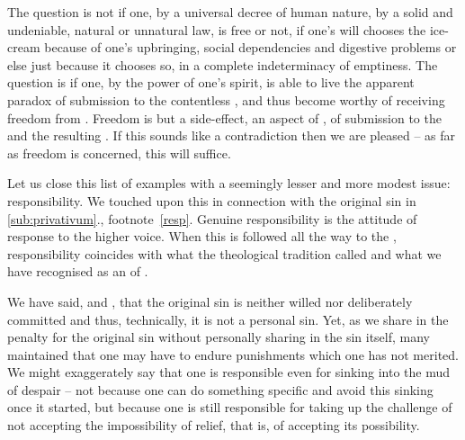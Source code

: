 The question is not if one, by a universal decree of human nature, by a solid
and undeniable, natural or unnatural law, is free or not, if one's will chooses
the ice-cream because of one's upbringing, social dependencies and digestive
problems or else just because it chooses so, in a complete indeterminacy of
emptiness.  The question is if one, by the power of one's {spirit}, is able to
live the apparent paradox of submission to the contentless , and
thus become worthy of receiving freedom from .  Freedom is but a
side-effect, an aspect of , of submission to the  and the
resulting .  If this sounds like a contradiction then we are
pleased -- as far as freedom is concerned, this will suffice.

Let us close this list of examples with a seemingly lesser and more modest
issue: responsibility. 
We touched upon this in connection with the original sin in
\ref{sub:privativum}., footnote~\ref{resp}. 
Genuine responsibility is the  attitude of response to the
higher voice. When this  is followed all the way to the , responsibility coincides with what the theological tradition called
 and what we have recognised as an  of
.

\pa\label{pa:respInv} \inv 
We have said,  and , that the
original sin is neither willed nor deliberately committed and thus,
technically, it is not a personal sin. Yet, as we share in the
penalty for the original sin without personally sharing in the sin 
itself, many maintained that one 
may have to endure punishments which one has not merited.
We might exaggerately say that one is responsible even for sinking into the mud
of despair -- not because one can do something specific and avoid this sinking
once it started, but because one is still responsible for
taking up the challenge of not accepting the  impossibility of
relief, that is, of accepting its  possibility.

